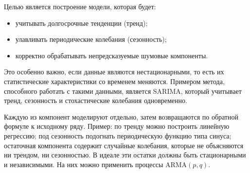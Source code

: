 Целью является построение модели, которая будет:
\begin{itemize}
  \item учитывать долгосрочные тенденции (тренд);
  \item улавливать периодические колебания (сезонность);
  \item корректно обрабатывать непредсказуемые шумовые компоненты.
\end{itemize}

Это особенно важно, если данные являются нестационарными, то есть их статистические характеристики со временем меняются. Примером метода, способного работать с такими данными, является SARIMA, который учитывает тренд, сезонность и стохастические колебания одновременно.

Каждую из компонент моделируют отдельно, затем возвращаются по обратной формуле к исходному ряду. Пример: по тренду можно построить линейную регрессию; под сезонность подогнать периодическую функцию типа синуса; остаточная компонента содержит случайные колебания, которые не объясняются ни трендом, ни сезонностью. В идеале эти остатки должны быть стационарными и независимыми. На них можно применить процессы ARMA$(p,q)$.

\clearpage
